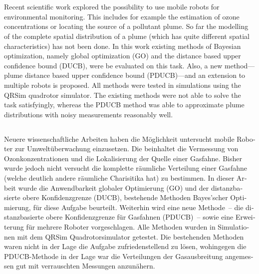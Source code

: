 \documentclass[11pt,a4paper,twoside,BCOR=15mm,listof=totoc]{scrbook}
\begin{document}
\cleardoublepage\thispagestyle{empty}
\vspace*{\fill}
\section*{\abstractname}
Recent scientific work explored the possibility to use mobile robots for 
environmental monitoring. This includes for example the estimation of ozone 
concentrations or locating the source of a pollutant plume. So far the modelling 
of the complete spatial distribution of a plume (which has quite different 
spatial characteristics) has not been done. In this work existing methods of 
Bayesian optimization, namely global optimization (GO) and the distance based 
upper confidence bound (DUCB), were be evaluated on this task. Also, a new 
method---plume distance based upper confidence bound (PDUCB)---and an extension 
to multiple robots is proposed.  All methods were tested in simulations using 
the QRSim quadrotor simulator. The existing methods were not able to solve the 
task satisfyingly, whereas the PDUCB method was able to approximate plume 
distributions with noisy measurements reasonably well.

\begin{german}
\section*{\abstractname}
Neuere wissenschaftliche Arbeiten haben die Möglichkeit untersucht mobile 
Roboter zur Umweltüberwachung einzusetzen. Die beinhaltet die Vermessung von 
Ozonkonzentrationen und die Lokalisierung der Quelle einer Gasfahne. Bisher 
wurde jedoch nicht versucht die komplette räumliche Verteilung einer Gasfahne 
(welche deutlich andere räumliche Charisitika hat) zu bestimmen. In dieser 
Arbeit wurde die Anwendbarkeit globaler Optimierung (GO) und der distanzbasierte 
obere Konfidenzgrenze (DUCB), bestehende Methoden Bayes'scher Optimierung, für 
diese Aufgabe beurteilt. Weiterhin wird eine neue Methode~-- die distanzbasierte 
obere Konfidenzgrenze für Gasfahnen (PDUCB)~-- sowie eine Erweiterung für 
mehrere Roboter vorgeschlagen. Alle Methoden wurden in Simulationen mit dem 
QRSim Quadrotorsimulator getestet. Die bestehenden Methoden waren nicht in der 
Lage die Aufgabe zufriedenstellend zu lösen, wohingegen die PDUCB-Methode in der 
Lage war die Verteilungen der Gasausbreitung angemessen gut mit verrauschten 
Messungen anzunähern.
\end{german}
\vspace*{\fill}
\end{document}
